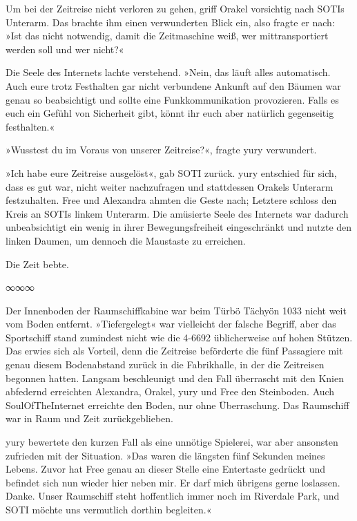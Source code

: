 Um bei der Zeitreise nicht verloren zu gehen, griff Orakel vorsichtig nach SOTIs Unterarm. Das brachte ihm einen verwunderten Blick ein, also fragte er nach: »Ist das nicht notwendig, damit die Zeitmaschine weiß, wer mittransportiert werden soll und wer nicht?«

Die Seele des Internets lachte verstehend. »Nein, das läuft alles automatisch. Auch eure trotz Festhalten gar nicht verbundene Ankunft auf den Bäumen war genau so beabsichtigt und sollte eine Funkkommunikation provozieren. Falls es euch ein Gefühl von Sicherheit gibt, könnt ihr euch aber natürlich gegenseitig festhalten.«

»Wusstest du im Voraus von unserer Zeitreise?«, fragte yury verwundert.

»Ich habe eure Zeitreise ausgelöst«, gab SOTI zurück. yury entschied für sich, dass es gut war, nicht weiter nachzufragen und stattdessen Orakels Unterarm festzuhalten. Free und Alexandra ahmten die Geste nach; Letztere schloss den Kreis an SOTIs linkem Unterarm. Die amüsierte Seele des Internets war dadurch unbeabsichtigt ein wenig in ihrer Bewegungsfreiheit eingeschränkt und nutzte den linken Daumen, um dennoch die Maustaste zu erreichen.

Die Zeit bebte.

\begin{center}
∞∞∞
\end{center}

Der Innenboden der Raumschiffkabine war beim Türbö Tächyön 1033 nicht weit vom Boden entfernt. »Tiefergelegt« war vielleicht der falsche Begriff, aber das Sportschiff stand zumindest nicht wie die 4-6692 üblicherweise auf hohen Stützen. Das erwies sich als Vorteil, denn die Zeitreise beförderte die fünf Passagiere mit genau diesem Bodenabstand zurück in die Fabrikhalle, in der die Zeitreisen begonnen hatten. Langsam beschleunigt und den Fall überrascht mit den Knien abfedernd erreichten Alexandra, Orakel, yury und Free den Steinboden. Auch SoulOfTheInternet erreichte den Boden, nur ohne Überraschung. Das Raumschiff war in Raum und Zeit zurückgeblieben.

yury bewertete den kurzen Fall als eine unnötige Spielerei, war aber ansonsten zufrieden mit der Situation. »Das waren die längsten fünf Sekunden meines Lebens. Zuvor hat Free genau an dieser Stelle eine Entertaste gedrückt und befindet sich nun wieder hier neben mir. Er darf mich übrigens gerne loslassen. Danke. Unser Raumschiff steht hoffentlich immer noch im Riverdale Park, und SOTI möchte uns vermutlich dorthin begleiten.«


